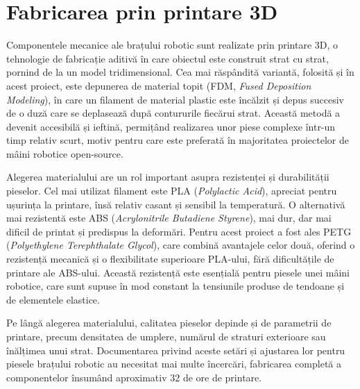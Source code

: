 \section{Fabricarea prin printare 3D}
\label{sec:biblio-print3d}

Componentele mecanice ale brațului robotic sunt realizate prin printare 3D, o
tehnologie de fabricație aditivă în care obiectul este construit strat cu strat,
pornind de la un model tridimensional. Cea mai răspândită variantă, folosită și în
acest proiect, este depunerea de material topit (FDM, \textit{Fused Deposition
Modeling}), în care un filament de material plastic este încălzit și depus succesiv
de o duză care se deplasează după contururile fiecărui strat. Această metodă a
devenit accesibilă și ieftină, permițând realizarea unor piese complexe într-un
timp relativ scurt, motiv pentru care este preferată în majoritatea proiectelor de
mâini robotice open-source.

Alegerea materialului are un rol important asupra rezistenței și durabilității
pieselor. Cel mai utilizat filament este PLA (\textit{Polylactic Acid}), apreciat
pentru ușurința la printare, însă relativ casant și sensibil la temperatură. O
alternativă mai rezistentă este ABS (\textit{Acrylonitrile Butadiene Styrene}),
mai dur, dar mai dificil de printat și predispus la deformări. Pentru acest
proiect a fost ales PETG (\textit{Polyethylene Terephthalate Glycol}), care
combină avantajele celor două, oferind o rezistență mecanică și o flexibilitate
superioare PLA-ului, fără dificultățile de printare ale ABS-ului. Această
rezistență este esențială pentru piesele unei mâini robotice, care sunt supuse în
mod constant la tensiunile produse de tendoane și de elementele elastice.

Pe lângă alegerea materialului, calitatea pieselor depinde și de parametrii de
printare, precum densitatea de umplere, numărul de straturi exterioare sau
înălțimea unui strat. Documentarea privind aceste setări și ajustarea lor pentru
piesele brațului robotic au necesitat mai multe încercări, fabricarea completă a
componentelor însumând aproximativ 32 de ore de printare.
